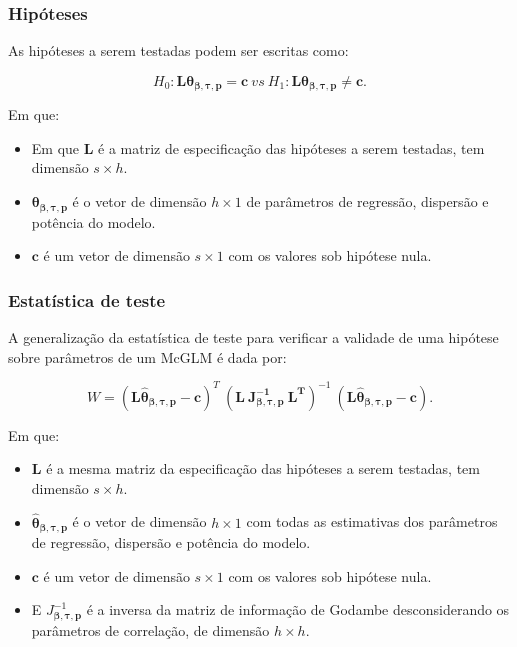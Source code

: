 \documentclass[10pt,
  aspectratio=169,
  serif,
  mathserif,
  professionalfont,
  compress,
  handout,
  ]{beamer}\usepackage[]{graphicx}\usepackage[]{color}
\begin{document}

\begin{frame}
\frametitle{Hipóteses}

As hipóteses a serem testadas podem ser escritas como:

$$H_0: \boldsymbol{L}\boldsymbol{\theta_{\beta,\tau,p}} = \boldsymbol{c} \ vs \ H_1: \boldsymbol{L}\boldsymbol{\theta_{\beta,\tau,p}} \neq \boldsymbol{c}.$$ 

Em que: 

\begin{itemize}
  
  \item Em que $\boldsymbol{L}$ é a matriz de especificação das hipóteses a serem testadas, tem dimensão $s \times h$. 
  
  \item $\boldsymbol{\theta_{\beta,\tau,p}}$ é o vetor de dimensão $h \times 1$ de parâmetros de regressão, dispersão e potência do modelo. 
  
  \item $\boldsymbol{c}$ é um vetor de dimensão $s \times 1$ com os valores sob hipótese nula.

\end{itemize}

\end{frame}


\begin{frame}
\frametitle{Estatística de teste}

A generalização da estatística de teste para verificar a validade de uma hipótese sobre parâmetros de um McGLM é dada por:

$$W = (\boldsymbol{L\hat\theta_{\beta,\tau,p}} - \boldsymbol{c})^T \ (\boldsymbol{L \ J_{\boldsymbol{{\beta,\tau,p}}}^{-1} \ L^T})^{-1} \ (\boldsymbol{L\hat\theta_{\beta,\tau,p}} - \boldsymbol{c}).$$

Em que: 

\begin{itemize}
  \item $\boldsymbol{L}$ é a mesma matriz da especificação das hipóteses a serem testadas, tem dimensão $s \times h$. 

  \item $\boldsymbol{\hat\theta_{\beta,\tau,p}}$ é o vetor de dimensão $h \times 1$ com todas as estimativas dos parâmetros de regressão, dispersão e potência do modelo. 

  \item $\boldsymbol{c}$ é um vetor de dimensão $s \times 1$ com os valores sob hipótese nula. 

  \item E $J_{\boldsymbol{{\beta,\tau,p}}}^{-1}$ é a inversa da matriz de informação de Godambe desconsiderando os parâmetros de correlação, de dimensão $h \times h$. 

\end{itemize}

\end{frame}
\end{document}
